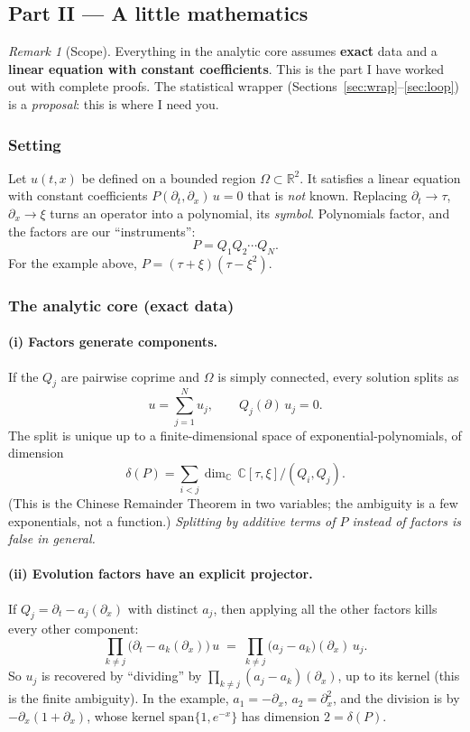 \documentclass[11pt]{article}
\theoremstyle{plain}
\theoremstyle{definition}
\theoremstyle{remark}
\newtheorem{remark}[theorem]{Remark}
\newcommand{\R}{\mathbb{R}}
\newenvironment{notebox}[1]{\begin{remark}[#1]}{\end{remark}}
\begin{document}
\subsection*{Part II --- A little mathematics}

\begin{notebox}{Scope}
Everything in the analytic core assumes \textbf{exact} data and a \textbf{linear equation with constant coefficients}. This is the part I have worked out with complete proofs. The statistical wrapper (Sections~\ref{sec:wrap}--\ref{sec:loop}) is a \emph{proposal}: this is where I need you.
\end{notebox}

\subsubsection{Setting}
Let $u(t,x)$ be defined on a bounded region $\Omega\subset\R^2$. It satisfies a linear equation with constant coefficients $P(\partial_t,\partial_x)\,u=0$ that is \emph{not} known. Replacing $\partial_t\to\tau$, $\partial_x\to\xi$ turns an operator into a polynomial, its \emph{symbol}. Polynomials factor, and the factors are our ``instruments'':
\[
P=Q_1Q_2\cdots Q_N .
\]
For the example above, $P=(\tau+\xi)(\tau-\xi^2)$.

\subsubsection{The analytic core (exact data)}\label{sec:core}

\paragraph{(i) Factors generate components.}
If the $Q_j$ are pairwise coprime and $\Omega$ is simply connected, every solution splits as
\[
u=\sum_{j=1}^{N}u_j,\qquad Q_j(\partial)\,u_j=0 .
\]
The split is unique up to a finite-dimensional space of exponential-polynomials, of dimension
\[
\delta(P)=\sum_{i<j}\dim_{\mathbb C}\,\mathbb C[\tau,\xi]\big/(Q_i,Q_j).
\]
(This is the Chinese Remainder Theorem in two variables; the ambiguity is a few exponentials, not a function.) \emph{Splitting by additive terms of $P$ instead of factors is false in general.}

\paragraph{(ii) Evolution factors have an explicit projector.}
If $Q_j=\partial_t-a_j(\partial_x)$ with distinct $a_j$, then applying all the other factors kills every other component:
\[
\prod_{k\ne j}\big(\partial_t-a_k(\partial_x)\big)\,u\;=\;\prod_{k\ne j}\big(a_j-a_k\big)(\partial_x)\,u_j .
\]
So $u_j$ is recovered by ``dividing'' by $\prod_{k\ne j}(a_j-a_k)(\partial_x)$, up to its kernel (this is the finite ambiguity). In the example, $a_1=-\partial_x$, $a_2=\partial_x^2$, and the division is by $-\partial_x(1+\partial_x)$, whose kernel $\mathrm{span}\{1,e^{-x}\}$ has dimension $2=\delta(P)$.
\end{document}
